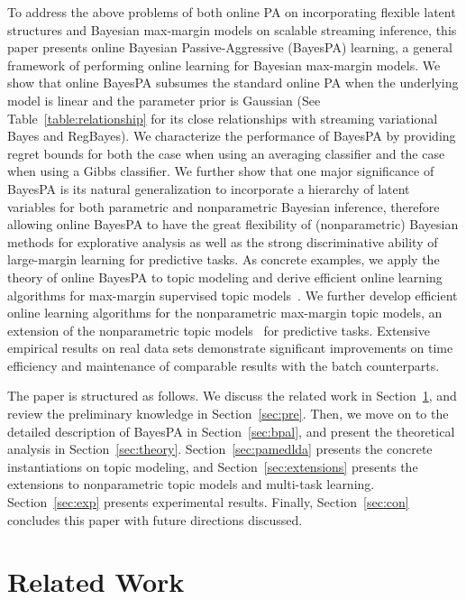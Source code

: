 \documentclass[twoside,11pt]{article}
\begin{document}
To address the above problems of both online PA on incorporating flexible latent structures and Bayesian max-margin models on scalable streaming inference, this paper presents online Bayesian Passive-Aggressive (BayesPA) learning, a general framework of performing online learning for Bayesian max-margin models. %
We show that online BayesPA subsumes the standard online PA when the underlying model is linear and the parameter prior is Gaussian (See Table~\ref{table:relationship} for its close relationships with streaming variational Bayes and RegBayes). We characterize the performance of BayesPA by providing regret bounds for both the case when using an averaging classifier and the case when using a Gibbs classifier. We further show that one major significance of BayesPA is its natural generalization to incorporate a hierarchy of latent variables for both parametric and nonparametric Bayesian inference, therefore allowing online BayesPA to have the great flexibility of (nonparametric) Bayesian methods for explorative analysis as well as the strong discriminative ability of large-margin learning for predictive tasks. As concrete examples, we apply the theory of online BayesPA to topic modeling and derive efficient online learning algorithms for max-margin supervised topic models~\citep{zhu2012medlda}. We further develop efficient online learning algorithms for the nonparametric max-margin topic models, an extension of the nonparametric topic models~\citep{teh2006hierarchical} for predictive tasks. Extensive empirical results on real data sets demonstrate significant improvements on time efficiency and maintenance of comparable results with the batch counterparts.

The paper is structured as follows. We discuss the related work in Section~\ref{sec:relatedwork}, and review the preliminary knowledge in Section~\ref{sec:pre}. Then, we move on to the detailed description of BayesPA in Section~\ref{sec:bpal}, and present the theoretical analysis in Section~\ref{sec:theory}. Section~\ref{sec:pamedlda} presents the concrete instantiations on topic modeling, and Section~\ref{sec:extensions} presents the extensions to nonparametric topic models and multi-task learning. Section~\ref{sec:exp} presents experimental results. Finally, Section~\ref{sec:con} concludes this paper with future directions discussed.

\section{Related Work}\label{sec:relatedwork}
\end{document}
